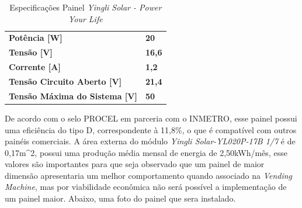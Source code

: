         \begin{table}[]
\centering
\caption{Especificações Painel \textit{Yingli Solar - Power Your Life} }
\label{Especificações Painel \textit{Yingli Solar - Power Your Life} }
\begin{tabular}{|l|l}
\cline{1-1}
\cellcolor[HTML]{FFFFFF}{\color[HTML]{000000} \textbf{Yingli Solar-YL020P-17B 1/7}} &                                    \\ \hline
\textbf{Potência {[}W{]}}                                                           & \multicolumn{1}{l|}{\textbf{20}}   \\ \hline
\textbf{Tensão {[}V{]}}                                                             & \multicolumn{1}{l|}{\textbf{16,6}} \\ \hline
\textbf{Corrente {[}A{]}}                                                           & \multicolumn{1}{l|}{\textbf{1,2}}  \\ \hline
\textbf{Tensão Circuito Aberto {[}V{]}}                                             & \multicolumn{1}{l|}{\textbf{21,4}} \\ \hline
\textbf{Tensão Máxima do Sistema {[}V{]}}                                           & \multicolumn{1}{l|}{\textbf{50}}   \\ \hline
\end{tabular}
\end{table}
        
        	De acordo com o selo PROCEL em parceria com o INMETRO, esse painel possui uma eficiência do tipo D, correspondente à 11,8\%, o que é compatível com outros painéis comerciais. 
            A área externa do módulo \textit{Yingli Solar-YL020P-17B 1/7} é de 0,17m^{2}, possui uma produção média mensal de energia de 2,50kWh/mês, esse valores são importantes para que seja observado que um painel de maior dimensão apresentaria um melhor comportamento quando associado na \textit{Vending Machine}, mas por viabilidade econômica não será possível a implementação de um painel maior.
            Abaixo, uma foto do painel que sera instalado.
            
